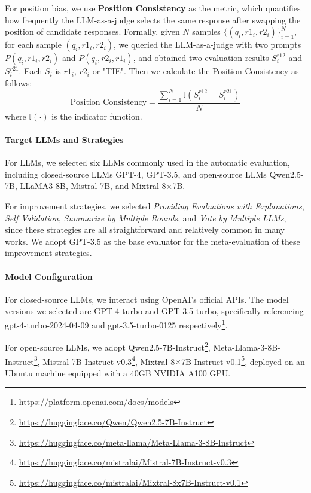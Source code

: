 For position bias, we use \textbf{Position Consistency} as the metric, which quantifies how frequently the LLM-as-a-judge selects the same response after swapping the position of candidate responses. Formally, given $N$ samples $\{(q_i,r1_i,r2_i)\}^N_{i=1}$, for each sample $(q_i,r1_i,r2_i)$, we queried the LLM-as-a-judge with two prompts $P(q_i,r1_i,r2_i)$ and $P(q_i,r2_i,r1_i)$, and obtained two evaluation results $S_i^{r12}$ and $S_i^{r21}$. Each $S_i$ is $r1_i$, $r2_i$ or "TIE". Then we calculate the Position Consistency as follows:
\begin{equation*}
    \text{Position Consistency}=\frac{\sum_{i=1}^N\mathbb{I}(S_i^{r12}=S_i^{r21})}{N}
\end{equation*}
where $\mathbb{I}(\cdot)$ is the indicator function.

\paragraph{\textbf{Target LLMs and Strategies}}
For LLMs, we selected six LLMs commonly used in the automatic evaluation, including closed-source LLMs GPT-4, GPT-3.5, and open-source LLMs Qwen2.5-7B, LLaMA3-8B, Mistral-7B, and Mixtral-8$\times$7B.

For improvement strategies, we selected \textit{Providing Evaluations with Explanations}, \textit{Self Validation}, \textit{Summarize by Multiple Rounds}, and \textit{Vote by Multiple LLMs}, since these strategies are all straightforward and relatively common in many works. We adopt GPT-3.5 as the base evaluator for the meta-evaluation of these improvement strategies.

\paragraph{\textbf{Model Configuration}}
For closed-source LLMs, we interact using OpenAI's official APIs. The model versions we selected are GPT-4-turbo and GPT-3.5-turbo, specifically referencing gpt-4-turbo-2024-04-09 and gpt-3.5-turbo-0125 respectively\footnote{\url{https://platform.openai.com/docs/models}}.

For open-source LLMs, we adopt Qwen2.5-7B-Instruct\footnote{\url{https://huggingface.co/Qwen/Qwen2.5-7B-Instruct}}, Meta-Llama-3-8B-Instruct\footnote{\url{https://huggingface.co/meta-llama/Meta-Llama-3-8B-Instruct}}, Mistral-7B-Instruct-v0.3\footnote{\url{https://huggingface.co/mistralai/Mistral-7B-Instruct-v0.3}}, Mixtral-8$\times$7B-Instruct-v0.1\footnote{\url{https://huggingface.co/mistralai/Mixtral-8x7B-Instruct-v0.1}}, deployed on an Ubuntu machine equipped with a 40GB NVIDIA A100 GPU. 

